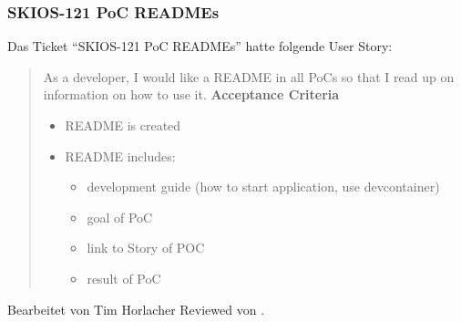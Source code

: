 \subsubsection{SKIOS-121 PoC READMEs}
Das Ticket \enquote{SKIOS-121 PoC READMEs} hatte folgende User Story:
\begin{quotation}
    As a developer, I would like a README in all PoCs so that I read up on information on how to use it.
\textbf{Acceptance Criteria}

\begin{itemize}
    \item README is created
    \item README includes:
    \begin{itemize}
        \item development guide (how to start application, use devcontainer)
        \item goal of PoC
        \item link to Story of POC
        \item result of PoC
    \end{itemize}
\end{itemize}
\end{quotation}
Bearbeitet von Tim Horlacher
Reviewed von .